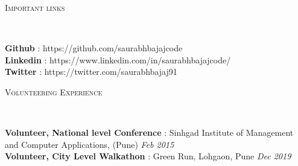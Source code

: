 \documentclass[9pt]{article}
\newenvironment{changemargin}[2]{%
  \begin{list}{}{%
    \setlength{\topsep}{0pt}%
    \setlength{\leftmargin}{#1}%
    \setlength{\rightmargin}{#2}%
    \setlength{\listparindent}{\parindent}%
    \setlength{\itemindent}{\parindent}%
    \setlength{\parsep}{\parskip}%
  }%
  \item[]}{\end{list}
}
\newcommand{\lineover}{
    \begin{changemargin}{-0.05in}{-0.05in}
        \vspace*{-8pt}
        \hrulefill \\
        \vspace*{-2pt}
    \end{changemargin}
}
\newcommand{\header}[1]{
    \begin{changemargin}{-0.5in}{-0.5in}
        \scshape{#1}\\
    \lineover
    \end{changemargin}
}
\newenvironment{body} {
    \vspace*{-16pt}
    \begin{changemargin}{-0.25in}{-0.5in}
  }
    {\end{changemargin}
}
\begin{document}
\smallskip
\smallskip
\smallskip
\smallskip


\header{Important links}

\begin{body}
    \vspace{14pt}
    \textbf{Github} : https://github.com/saurabhbajajcode \hfill{}\\
    \smallskip
    \textbf{Linkedin} : https://www.linkedin.com/in/saurabhbajajcode/ \hfill{}\\
    \smallskip
    \textbf{Twitter} : https://twitter.com/saurabhbajaj91 \hfill{}\\
\end{body}

\smallskip

\header{Volunteering Experience}

\begin{body}
    \vspace{14pt}
    \textbf{Volunteer, National level Conference} : Sinhgad Institute of Management and Computer Applications, (Pune) \hfill {} \emph{Feb 2015}\\
    \smallskip
    \textbf{Volunteer, City Level Walkathon} : Green Run, Lohgaon, Pune \hfill{} \emph{Dec 2019}\\
    \smallskip
\end{body}

\smallskip



\smallskip
\end{document}
